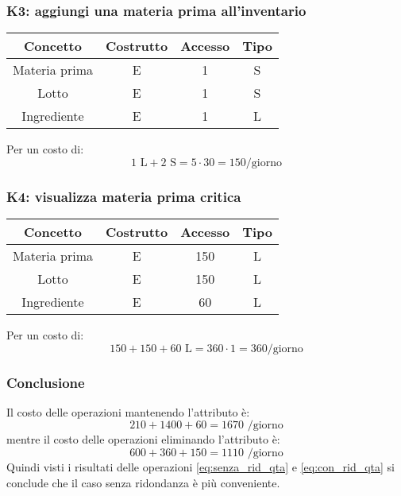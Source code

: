 \documentclass[a4paper,12pt]{report}
\begin{document}
\subsubsection{K3: aggiungi una materia prima all'inventario}
\begin{table}[H]
    \centering
    \begin{tabular}{|| c | c | c | c ||}
        \hline
        Concetto & Costrutto & Accesso & Tipo\\
        \hline
        Materia prima & E & 1 & S\\
        \hline
        Lotto & E & 1 & S\\
        \hline
        Ingrediente & E & 1 & L\\
        \hline
    \end{tabular}
\end{table}
Per un costo di: 
\begin{equation}
    1\text{ L} + 2\text{ S} = 5 \cdot 30 = 150\text{/giorno}
\end{equation}
%
\subsubsection{K4: visualizza materia prima critica}
\begin{table}[H]
    \centering
    \begin{tabular}{|| c | c | c | c ||}
        \hline
        Concetto & Costrutto & Accesso & Tipo\\
        \hline
        Materia prima & E & 150 & L\\
        \hline
        Lotto & E & 150 & L\\
        \hline
        Ingrediente & E & 60 & L\\
        \hline
    \end{tabular}
\end{table}
Per un costo di: 
\begin{equation}
    150 + 150 + 60\text{ L} = 360 \cdot 1 = 360\text{/giorno}
\end{equation}
\subsubsection{Conclusione}
Il costo delle operazioni mantenendo l'attributo è:
\begin{equation}\label{eq:con_rid_qta}
    210 + 1400 + 60 = 1670 \text{ /giorno}
\end{equation}
mentre il costo delle operazioni eliminando l'attributo è: 
\begin{equation}\label{eq:senza_rid_qta}
    600 + 360 + 150 = 1110 \text{ /giorno}
\end{equation}
Quindi visti i risultati delle operazioni \ref{eq:senza_rid_qta} e \ref{eq:con_rid_qta} si conclude che il caso senza ridondanza è più conveniente.
\end{document}
